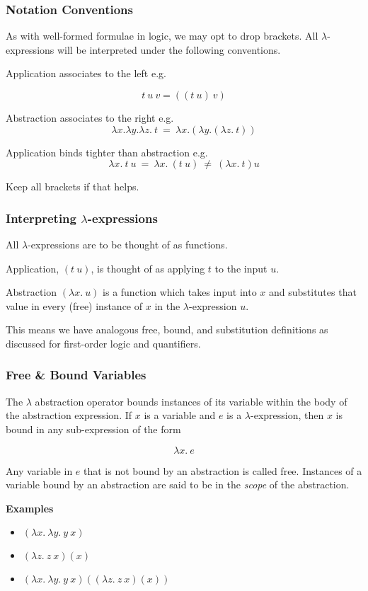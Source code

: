 \documentclass{beamer}
\begin{document}
\begin{frame}
	\frametitle{Notation Conventions}

	As with well-formed formulae in logic, we may opt to drop brackets. All $\lambda$-expressions will be interpreted under the following conventions.

	Application associates to the left e.g. 
	
	$$t \ u \ v = ((t \ u) \ v)$$

	Abstraction associates to the right e.g. $$\lambda x. \lambda y. \lambda z. \ t \ = \ \lambda x. (\lambda y. (\lambda z. \ t))$$

	Application binds tighter than abstraction e.g. $$\lambda x. \ t \ u \ = \ \lambda x. \ (t \ u) \ \neq \ (\lambda x. \ t) u $$

	Keep all brackets if that helps.  
	
\end{frame}

\begin{frame}
	\frametitle{Interpreting $\lambda$-expressions}

	All $\lambda$-expressions are to be thought of as functions.

	Application, $(t \ u)$, is thought of as applying $t$ to the input $u$.

	Abstraction $(\lambda x. \ u)$ is a function which takes input into $x$ and substitutes that value in every (free) instance of $x$ in the $\lambda$-expression $u$.

	This means we have analogous free, bound, and substitution definitions as discussed for first-order logic and quantifiers. 

\end{frame}

\begin{frame}
	\frametitle{Free \& Bound Variables}

	The $\lambda$ abstraction operator bounds instances of its variable within the body of the abstraction expression. If $x$ is a variable and $e$ is a $\lambda$-expression, then $x$ is bound in any sub-expression of the form 
	
	$$\lambda x. \ e$$

	Any variable in $e$ that is not bound by an abstraction is called free. Instances of a variable bound by an abstraction are said to be in the \emph{scope} of the abstraction. 
	
	{\bf Examples}

	\begin{itemize}

		\item[] $(\lambda x. \ \lambda y. \ y \ x)$ \vspace{0.2cm}

		\item[] $(\lambda z. \ z \ x)(x) $ \vspace{0.2cm}

		\item[] $(\lambda x. \ \lambda y. \ y \ x)((\lambda z. \ z \ x)(x))$
	
	\end{itemize}
	
\end{frame}
\end{document}
